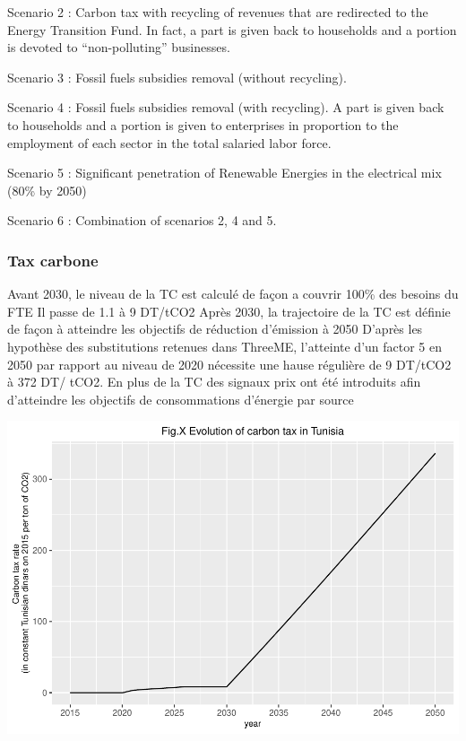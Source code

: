 \documentclass[
]{article}
\begin{document}
Scenario 2 : Carbon tax with recycling of revenues that are redirected
to the Energy Transition Fund. In fact, a part is given back to
households and a portion is devoted to ``non-polluting'' businesses.

Scenario 3 : Fossil fuels subsidies removal (without recycling).

Scenario 4 : Fossil fuels subsidies removal (with recycling). A part is
given back to households and a portion is given to enterprises in
proportion to the employment of each sector in the total salaried labor
force.

Scenario 5 : Significant penetration of Renewable Energies in the
electrical mix (80\% by 2050)

Scenario 6 : Combination of scenarios 2, 4 and 5.

\hypertarget{tax-carbone}{%
\subsubsection{Tax carbone}\label{tax-carbone}}

Avant 2030, le niveau de la TC est calculé de façon a couvrir 100\% des
besoins du FTE Il passe de 1.1 à 9 DT/tCO2 Après 2030, la trajectoire de
la TC est définie de façon à atteindre les objectifs de réduction
d'émission à 2050 D'après les hypothèse des substitutions retenues dans
ThreeME, l'atteinte d'un factor 5 en 2050 par rapport au niveau de 2020
nécessite une hause régulière de 9 DT/tCO2 à 372 DT/ tCO2. En plus de la
TC des signaux prix ont été introduits afin d'atteindre les objectifs de
consommations d'énergie par source

\includegraphics{Modele-ThreeMe-Tunisie_Sequeira_Valilou_Wang_files/figure-latex/unnamed-chunk-6-1.pdf}
\end{document}
